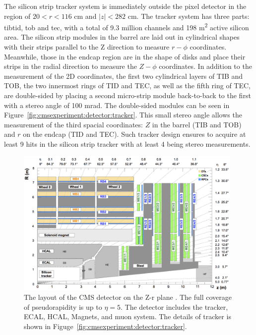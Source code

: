 The silicon strip tracker system is immediately outside the pixel detector in the region of $20<r<116$ cm and $|z|<282$ cm. The tracker system has three parts: \acrfull{tibtid}, \acrfull{tob} and \acrfull{tec}, with a total of 9.3 million channels and 198 \si{\m \squared} active silicon area. The silicon strip modules in the barrel are laid out in cylindrical shapes with their strips parallel to the Z direction to measure $r-\phi$ coordinates. Meanwhile, those in the endcap region are in the shape of disks and place their strips in the radial direction to measure the $Z-\phi$ coordinates. In addition to the measurement of the 2D coordinates, the first two cylindrical layers of TIB and TOB, the two innermost rings of TID and TEC, as well as the fifth ring of TEC, are double-sided by placing a second micro-strip module back-to-back to the first with a stereo angle of 100 mrad. The double-sided modules can be seen in Figure~\ref{fig:cmsexperiment:detector:tracker}. This small stereo angle allows the measurement of the third spacial coordinates: $Z$ in the barrel (TIB and TOB) and $r$ on the endcap (TID and TEC). Such tracker design ensures to acquire at least 9 hits in the silicon strip tracker with at least 4 being stereo measurements. 




\begin{figure}[ht]
    \centering
    \includegraphics[width=0.98\textwidth]{chapters/CMSExperiment/sectionDetector/figures/detectorLayout.png}
    \caption{The layout of the CMS detector on the Z-r plane \cite{cms:muonChamberWebsite}. The full coverage of pseudorapidity is up to $\eta=5$. The detector includes the tracker, ECAL, HCAL, Magnets, and muon system. The details of tracker is shown in Figuge~\ref{fig:cmsexperiment:detector:tracker}. }
    \label{fig:cmsexperiment:detector:detectorLayout}
\end{figure}





